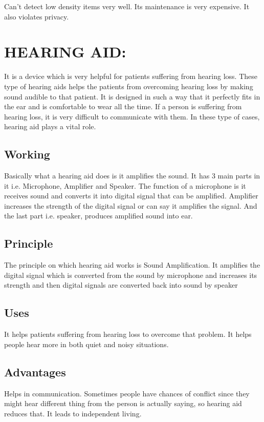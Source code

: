 \documentclass[12pt]{article}
\begin{document}
Can’t detect low density items very well.
Its maintenance is very expensive.
It also violates privacy.

\section{HEARING AID:}

It is a device which is very helpful for patients suffering from hearing loss. These type of hearing aids helps the patients from overcoming hearing loss by making sound audible  to that patient. It is designed in such a way that it perfectly fits in the ear and is comfortable to wear all the  time. If a person is suffering from hearing loss, it is very difficult to communicate with them. In these type of cases, hearing aid plays a vital role.




\subsection{Working}
Basically what a hearing aid does is it amplifies the sound. It has 3 main parts in it i.e. Microphone, Amplifier and Speaker. The function of a microphone is it receives sound and converts it into digital signal that can be amplified. Amplifier increases the strength of the digital signal or can say it amplifies the signal.  And the last part i.e. speaker, produces amplified sound into ear.


\subsection{Principle}
The principle on which hearing aid works is Sound Amplification. It amplifies the digital signal which is converted from the sound by microphone and increases its strength and then digital signals are converted back into sound by speaker


\subsection{Uses}

It helps patients suffering from hearing loss to overcome that problem. It helps people hear more in both quiet and noisy situations.

\subsection{Advantages}
Helps in communication.
Sometimes people have chances of conflict since they might hear different thing from the person is actually saying, so hearing aid reduces that.
It leads to independent living.
\end{document}
